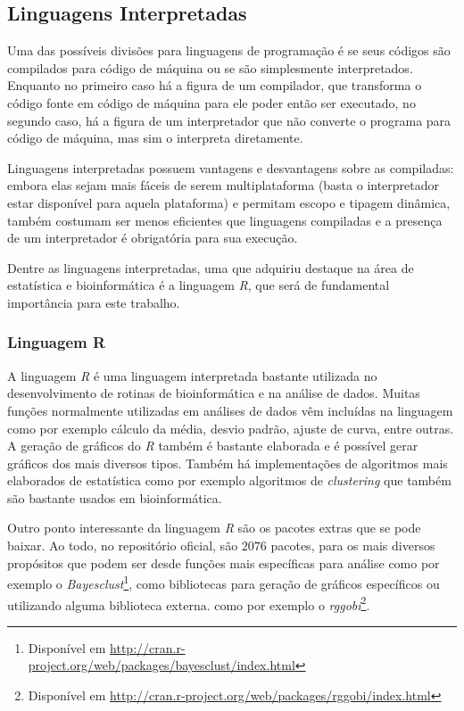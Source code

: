 \subsection{Linguagens Interpretadas}

Uma das possíveis divisões para linguagens de programação é se seus códigos são compilados para código de máquina ou se são simplesmente 
interpretados. Enquanto no primeiro caso há a figura de um compilador, que transforma o código fonte em código de máquina 
para ele poder então ser executado, no segundo caso,
há a figura de um interpretador que não converte o programa para 
código de máquina, mas sim o interpreta diretamente. 

Linguagens interpretadas possuem vantagens e desvantagens sobre as compiladas: embora elas sejam mais fáceis 
de serem multiplataforma (basta o interpretador
estar disponível para aquela plataforma) e permitam escopo e tipagem dinâmica, também costumam ser menos eficientes que linguagens compiladas e 
a presença de um interpretador é obrigatória para sua execução. 

Dentre as linguagens interpretadas, uma que adquiriu destaque na área de estatística e bioinformática é a linguagem \emph{R}, que 
será de fundamental importância para este trabalho. 


\subsubsection{Linguagem R}

A linguagem \emph{R} é uma linguagem interpretada bastante utilizada no desenvolvimento de rotinas de bioinformática e na análise de
dados. Muitas funções normalmente utilizadas em análises de dados vêm incluídas na linguagem como por exemplo cálculo da
 média, desvio padrão, ajuste de curva, entre outras. A geração de gráficos do \emph{R} também é bastante elaborada e é possível 
gerar gráficos dos mais diversos tipos. Também há implementações de algoritmos mais elaborados de estatística como por 
exemplo algoritmos de \emph{clustering} que também são bastante usados em bioinformática.

Outro ponto interessante da linguagem \emph{R} são os pacotes extras que se pode baixar. Ao todo, no repositório oficial,
são $2076$ pacotes, para os mais diversos propósitos que podem ser desde funções mais específicas para análise como 
por exemplo o \emph{Bayesclust}\footnote{Disponível em \url{http://cran.r-project.org/web/packages/bayesclust/index.html}}, 
como bibliotecas para geração de gráficos específicos ou utilizando alguma biblioteca externa. como por exemplo o 
\emph{rggobi}\footnote{Disponível em \url{http://cran.r-project.org/web/packages/rggobi/index.html}}. 

